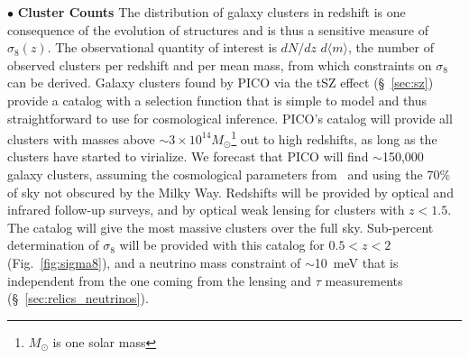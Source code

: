 \documentclass[PICOReport.tex]{subfiles}
\begin{document}
\noindent$\bullet$ {\bf Cluster Counts} \hspace{0.1in} \label{clusters}  
The distribution of galaxy clusters in redshift is one consequence of the evolution of structures and is thus a sensitive measure of $\sigma_{8}(z)$. The observational quantity of interest is $dN/dz \,\, d \langle m \rangle$, the number of observed clusters per redshift and per mean mass, from which constraints on $\sigma_{8}$ can be derived. Galaxy clusters found by PICO via the \ac{tSZ} effect (\S~\ref{sec:sz}) provide a catalog with a selection function that is simple to model and thus straightforward to use for cosmological inference. PICO's catalog will provide all clusters with masses above $\sim3\times10^{14} M_\odot$\footnote{$M_\odot$ is one solar mass}  out to high redshifts,  as long as the clusters have started to virialize. We forecast that PICO will find $\sim$150,000 galaxy clusters, assuming the cosmological parameters from \planck\  and using the 70\% of sky not obscured by the Milky Way.  Redshifts will be provided by optical and infrared follow-up surveys, and by optical weak lensing for clusters with $z < 1.5$. The catalog will give the most massive clusters over the full sky. Sub-percent determination of $\sigma_{8}$ will be provided with this catalog for $0.5 < z < 2$ (Fig.~\ref{fig:sigma8}), and a neutrino mass constraint of $\sim$10~meV that is independent from the one coming from the lensing and $\tau$ measurements (\S~\ref{sec:relics_neutrinos}). 


\end{document}

